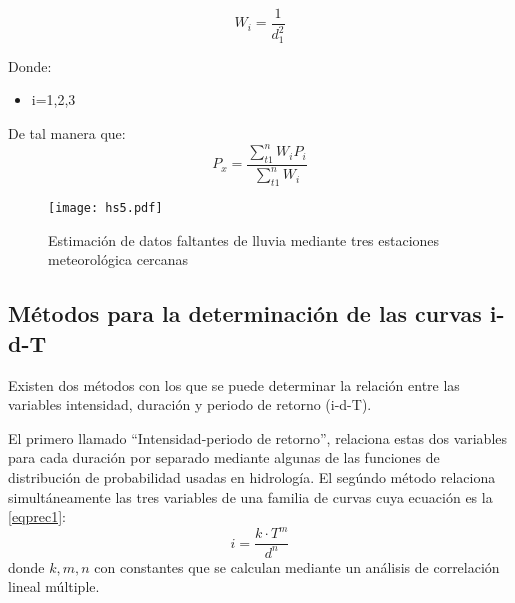 \begin{equation}
    W_i = \frac{1}{d_1^2}
\end{equation}
\begin{notation}
Donde:
\begin{itemize}
    \item i=1,2,3
\end{itemize}
\end{notation}
De tal manera que:
\begin{equation}
    P_x=\frac{\sum_{t1}^{n}W_iP_i}{\sum_{t1}^{n}W_i}
\end{equation}
\begin{figure}[h!]
\centering
  \texttt{[image: hs5.pdf]}
  \caption{Estimación de datos faltantes de lluvia mediante tres estaciones meteorológica cercanas}
  \label{5}
\end{figure}
\subsection{Métodos para la determinación de las curvas i-d-T}
Existen dos métodos con los que se puede determinar la relación entre las variables intensidad, duración y periodo de retorno (i-d-T). 

El primero llamado ``Intensidad-periodo de retorno'', relaciona estas dos variables para cada duración por separado mediante algunas de las funciones de distribución de probabilidad usadas en hidrología. El segúndo método relaciona simultáneamente las tres variables de una familia de curvas cuya ecuación es la \eqref{eqprec1}:
\begin{equation}
    i = \frac{k \cdot T^m}{d^n}
    \label{eqprec1}
\end{equation}
donde $k,m,n$ con constantes que se calculan mediante un análisis de correlación lineal múltiple.


